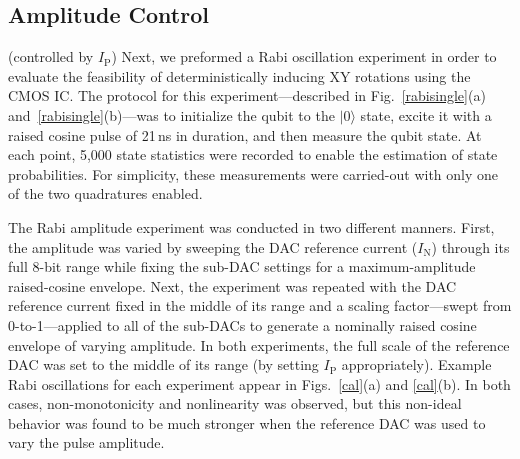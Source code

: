 \documentclass[journal]{IEEEtran}
\newcommand{\CR}[1]{{\color{black}#1}}
\begin{document}
\subsection{Amplitude Control}(controlled by $I_\text{P}$)
Next, we preformed a Rabi oscillation experiment in order to evaluate the feasibility of deterministically inducing XY rotations using the CMOS IC. The protocol for this experiment\CR{---}described in Fig.~\ref{rabisingle}(a) and~\ref{rabisingle}(b)\CR{---}was to initialize the qubit to the $|0\rangle$ state, excite it with a raised cosine pulse of \CR{21\,ns} in duration, and then measure the qubit state. \CR{At each point, 5,000 state statistics were recorded to enable the estimation of state probabilities. For simplicity, these measurements were carried-out with only one of the two quadratures enabled.}


\CR{The Rabi amplitude experiment was conducted in two different manners. First, the amplitude was varied by sweeping the DAC reference current ($I_\text{N}$) through its full 8-bit range while fixing the sub-DAC settings for a maximum-amplitude raised-cosine envelope. Next, the experiment was repeated with the DAC reference current fixed in the middle of its range and a scaling factor---swept from 0-to-1---applied to all of the sub-DACs to generate a nominally raised cosine envelope of varying amplitude.  In both experiments, the full scale of the reference DAC was set to the middle of its range (by setting $I_\text{P}$ appropriately). Example Rabi oscillations for each experiment appear in Figs.~\ref{cal}(a) and \ref{cal}(b). In both cases, non-monotonicity and nonlinearity was observed, but this non-ideal behavior was found to be  much stronger when the reference DAC was used to vary the pulse amplitude.}  

\end{document}
